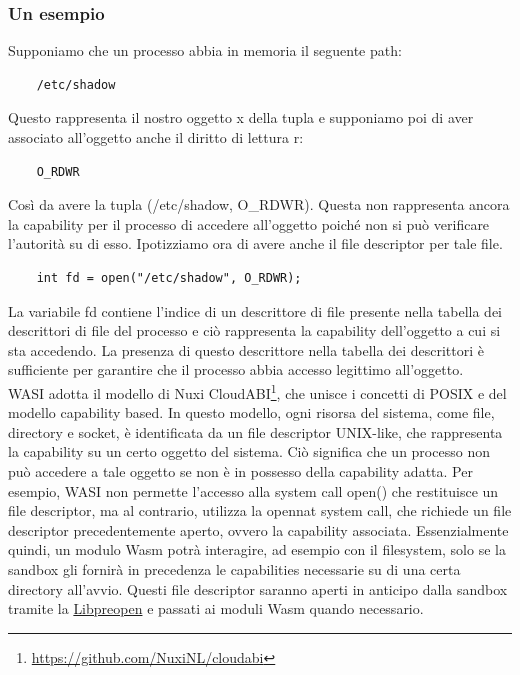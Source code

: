 \subsubsection{Un esempio}
Supponiamo che un processo abbia in memoria il seguente path:
\begin{lstlisting}
    /etc/shadow
\end{lstlisting}
Questo rappresenta il nostro oggetto x della tupla e supponiamo poi di aver associato all'oggetto anche il diritto di
lettura r: 
\begin{lstlisting}
    O_RDWR
\end{lstlisting}
Così da avere la tupla (/etc/shadow, O\_RDWR). Questa non rappresenta ancora la capability per il processo di accedere
all'oggetto poiché non si può verificare l'autorità su di esso. Ipotizziamo ora di avere anche il file descriptor per
tale file.
\begin{lstlisting}
    int fd = open("/etc/shadow", O_RDWR);
\end{lstlisting}
La variabile fd contiene l'indice di un descrittore di file presente nella tabella dei descrittori di file del processo
e ciò rappresenta la capability dell'oggetto a cui si sta accedendo. La presenza di questo descrittore nella tabella dei
descrittori è sufficiente per garantire che il processo abbia accesso legittimo all'oggetto. \\

WASI adotta il modello di Nuxi CloudABI\footnote{\url{https://github.com/NuxiNL/cloudabi}}, che unisce i concetti di
POSIX e del modello capability based. In questo modello, ogni risorsa del sistema, come file, directory e socket, è
identificata da un file descriptor UNIX-like, che rappresenta la capability su un certo oggetto del sistema. Ciò
significa che un processo non può accedere a tale oggetto se non è in possesso della capability adatta. Per esempio,
WASI non permette l'accesso alla system call open() che restituisce un file descriptor, ma al contrario, utilizza la
opennat system call, che richiede un file descriptor precedentemente aperto, ovvero la capability associata.
Essenzialmente quindi, un modulo Wasm potrà interagire, ad esempio con il filesystem, solo se la sandbox gli fornirà in
precedenza le capabilities necessarie su di una certa directory all'avvio. Questi file descriptor saranno aperti in
anticipo dalla sandbox tramite la \hyperref[sec:libpreopen]{Libpreopen} e passati ai moduli Wasm quando necessario.
